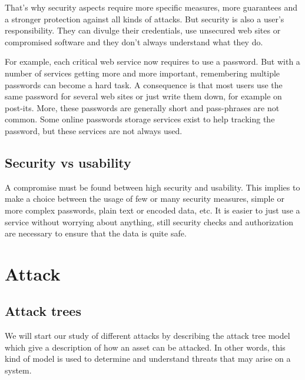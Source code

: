 That's why security aspects require more specific measures, more guarantees and
a stronger protection against all kinds of attacks. But security is also a user's
responsibility. They can divulge their credentials, use unsecured web sites or
compromised software and they don't always understand what they do.

For example, each critical web service now requires to use a password.
But with a number of services getting more and more important, remembering
multiple passwords can become a hard task. A consequence is that most users use
the same password for several web sites or just write them down, for example
on post-its. More, these passwords are generally short and pass-phrases are
not common.
Some online passwords storage services exist to help tracking the password, but
these services are not always used.

\subsection{Security vs usability}

A compromise must be found between high security and usability.
This implies to make a choice between the usage of few or many security
measures, simple or more complex passwords, plain text or encoded data, etc.
It is easier to just use a service without worrying about anything, still
security checks and authorization are necessary to ensure that the data is
quite safe.

\section{Attack}

\subsection{Attack trees}
We will start our study of different attacks by describing the attack tree model
which give a description of how an asset can be attacked. In other words, this
kind of model is used to determine and understand threats that may arise on a
system. 

